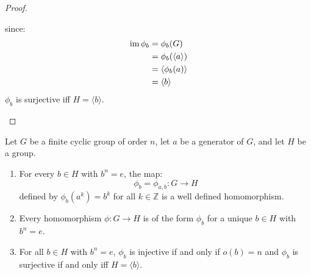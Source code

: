 \begin{itemize}
\begin{proof}
\begin{enumerate}
            since:
            \begin{align}
                \operatorname{im} \phi_b &= \phi_b(G) \\ 
                &= \phi_b(\langle a\rangle) \\ 
                &= \langle \phi_b(a)\rangle \\ 
                &= \langle b\rangle
            \end{align}
            $\phi_b$ is surjective iff $H=\langle b\rangle$.
        \end{enumerate}
    \end{proof}
    \begin{theorem}
        Let $G$ be a finite cyclic group of order $n$, let $a$ be a generator of $G$, and let $H$ be a group.
        \begin{enumerate}
            \item For every $b\in H$ with $b^n=e$, the map:
            \begin{equation}
                \phi_b = \phi_{a,b} : G\rightarrow H
            \end{equation}
            defined by $\phi_b(a^k)=b^k$ for all $k\in \mathbb{Z}$ is a well defined homomorphism.
            \item Every homomorphism $\phi:G\rightarrow H$ is of the form $\phi_b$ for a unique $b\in H$ with $b^n=e$.
            \item For all $b\in H$ with $b^n=e$, $\phi_b$ is injective if and only if $o(b)=n$ and $\phi_b$ is surjective if and only iff  $H=\langle b\rangle$.
        \end{enumerate}
    \end{theorem}
\end{itemize}
